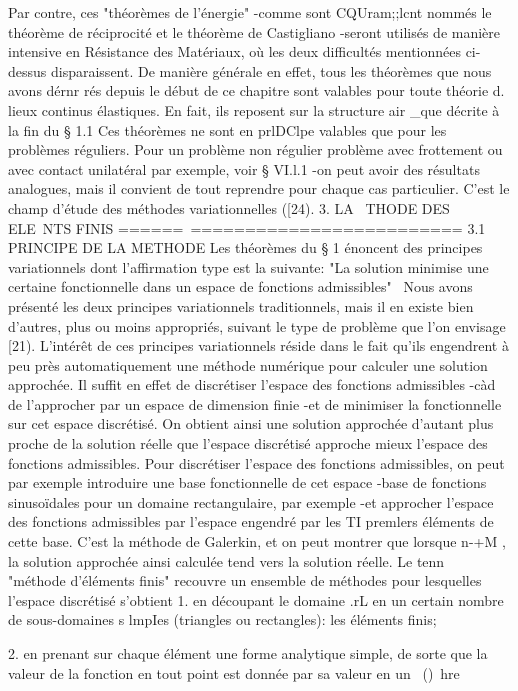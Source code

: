 Par contre, ces "théorèmes de l'énergie" -comme sont CQUram;;lcnt nommés le théorème de réciprocité et le théorème de Castigliano -seront utilisés de manière intensive en Résistance des Matériaux, où les deux dif­ficultés mentionnées ci-dessus disparaissent. De manière générale en effet, tous les théorèmes que nous avons dérnr rés depuis le début de ce chapitre 
sont valables pour toute théorie d. lieux continus élastiques. En fait, 
ils reposent sur la structure air _que décrite à la fin du § 1.1 
Ces théorèmes ne sont en prlDClpe valables que pour les problèmes réguliers. Pour un problème non régulier problème avec frottement ou avec contact unilatéral par exemple, voir § VI.l.1 -on peut avoir des résultats analogues, mais il convient de tout reprendre pour chaque cas particulier. C'est le champ d'étude des méthodes variationnelles ([24). 
3. LA ~THODE DES ELE~NTS FINIS 
======~========================= 
3.1 PRINCIPE DE LA METHODE 
Les théorèmes du § 1 énoncent des principes variationnels dont l'affirmation type est la suivante: "La solution minimise une certaine fonc­tionnelle dans un espace de fonctions admissibles"~ Nous avons présenté les deux principes variationnels traditionnels, mais il en existe bien d'autres, plus ou moins appropriés, suivant le type de problème que l'on envisage [21). L'intérêt de ces principes variationnels réside dans le fait qu'ils engen­drent à peu près automatiquement une méthode numérique pour calculer une so­lution approchée. Il suffit en effet de discrétiser l'espace des fonctions admissibles -càd de l'approcher par un espace de dimension finie -et de 
minimiser la fonctionnelle sur cet espace discrétisé. On obtient ainsi une 
solution approchée d'autant plus proche de la solution réelle que l'espace discrétisé approche mieux l'espace des fonctions admissibles. 
Pour discrétiser l'espace des fonctions admissibles, on peut par exemple introduire une base fonctionnelle de cet espace -base de fonctions sinusoïdales pour un domaine rectangulaire, par exemple -et approcher l'es­pace des fonctions admissibles par l'espace engendré par les TI premlers éléments de cette base. C'est la méthode de Galerkin, et on peut montrer que lorsque n-+M , la solution approchée ainsi calculée tend vers la solution réelle. 
Le tenn~ "méthode d'éléments finis" recouvre un ensemble de métho­des pour lesquelles l'espace discrétisé s'obtient 
1. 
en découpant le domaine .rL en un certain nombre de sous-domaines s lm­pIes (triangles ou rectangles): les éléments finis; 

2. 
en prenant sur chaque élément une forme analytique simple, de sorte que la valeur de la fonction en tout point est donnée par sa valeur en un ~()~hre 


